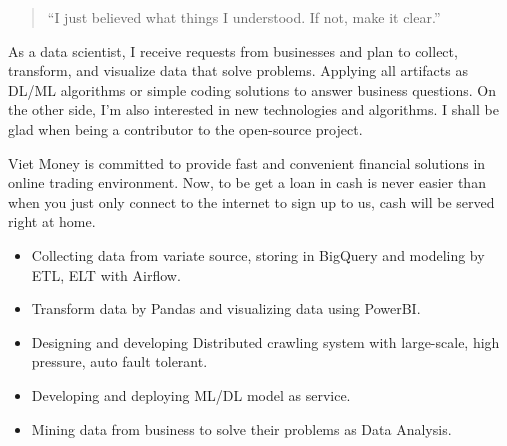 \documentclass[10pt,a4paper,ragged2e,withhyper]{altacv}
\begin{document}
\begin{paracol}{2}
\bigskip

\begin{quote}
	``I just believed what things I understood. If not, make it clear.''
\end{quote}

\bigskip

\begin{minipage}{\linewidth}
\justifying
As a data scientist, I receive requests from businesses and plan to collect, transform, and visualize data that solve problems. Applying all artifacts as DL/ML algorithms or simple coding solutions to answer business questions. On the other side, I'm also interested in new technologies and algorithms. I shall be glad when being a contributor to the open-source project.
\end{minipage}

\smallskip



\begin{minipage}{\linewidth}
\justifying
Viet Money is committed to provide fast and convenient financial solutions in online trading environment. Now, to be get a loan in cash is never easier than when you just only connect to the internet to sign up to us, cash will be served right at home.
\end{minipage}

\medskip

\begin{itemize}
	\item Collecting data from variate source, storing in BigQuery and modeling by ETL, ELT with Airflow.
	\item Transform data by Pandas and visualizing data using PowerBI.
	\item Designing and developing Distributed crawling system with large-scale, high pressure, auto fault tolerant.
    \item Developing and deploying ML/DL model as service.
    \item Mining data from business to solve their problems as Data Analysis. 
\end{itemize}

\smallskip


\end{paracol}
\end{document}
